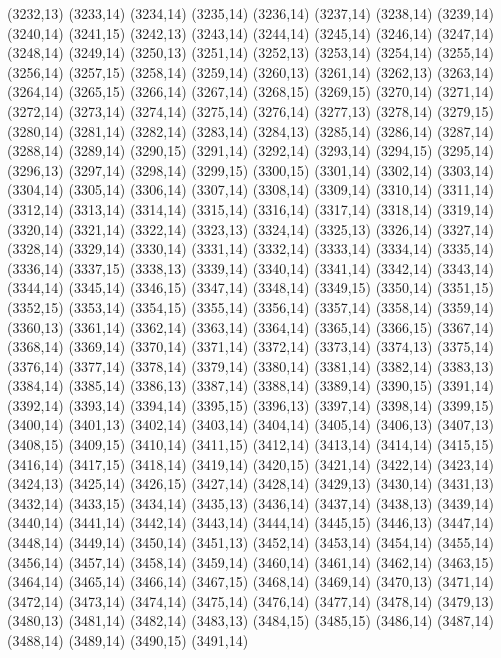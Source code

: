 (3232,13)
(3233,14)
(3234,14)
(3235,14)
(3236,14)
(3237,14)
(3238,14)
(3239,14)
(3240,14)
(3241,15)
(3242,13)
(3243,14)
(3244,14)
(3245,14)
(3246,14)
(3247,14)
(3248,14)
(3249,14)
(3250,13)
(3251,14)
(3252,13)
(3253,14)
(3254,14)
(3255,14)
(3256,14)
(3257,15)
(3258,14)
(3259,14)
(3260,13)
(3261,14)
(3262,13)
(3263,14)
(3264,14)
(3265,15)
(3266,14)
(3267,14)
(3268,15)
(3269,15)
(3270,14)
(3271,14)
(3272,14)
(3273,14)
(3274,14)
(3275,14)
(3276,14)
(3277,13)
(3278,14)
(3279,15)
(3280,14)
(3281,14)
(3282,14)
(3283,14)
(3284,13)
(3285,14)
(3286,14)
(3287,14)
(3288,14)
(3289,14)
(3290,15)
(3291,14)
(3292,14)
(3293,14)
(3294,15)
(3295,14)
(3296,13)
(3297,14)
(3298,14)
(3299,15)
(3300,15)
(3301,14)
(3302,14)
(3303,14)
(3304,14)
(3305,14)
(3306,14)
(3307,14)
(3308,14)
(3309,14)
(3310,14)
(3311,14)
(3312,14)
(3313,14)
(3314,14)
(3315,14)
(3316,14)
(3317,14)
(3318,14)
(3319,14)
(3320,14)
(3321,14)
(3322,14)
(3323,13)
(3324,14)
(3325,13)
(3326,14)
(3327,14)
(3328,14)
(3329,14)
(3330,14)
(3331,14)
(3332,14)
(3333,14)
(3334,14)
(3335,14)
(3336,14)
(3337,15)
(3338,13)
(3339,14)
(3340,14)
(3341,14)
(3342,14)
(3343,14)
(3344,14)
(3345,14)
(3346,15)
(3347,14)
(3348,14)
(3349,15)
(3350,14)
(3351,15)
(3352,15)
(3353,14)
(3354,15)
(3355,14)
(3356,14)
(3357,14)
(3358,14)
(3359,14)
(3360,13)
(3361,14)
(3362,14)
(3363,14)
(3364,14)
(3365,14)
(3366,15)
(3367,14)
(3368,14)
(3369,14)
(3370,14)
(3371,14)
(3372,14)
(3373,14)
(3374,13)
(3375,14)
(3376,14)
(3377,14)
(3378,14)
(3379,14)
(3380,14)
(3381,14)
(3382,14)
(3383,13)
(3384,14)
(3385,14)
(3386,13)
(3387,14)
(3388,14)
(3389,14)
(3390,15)
(3391,14)
(3392,14)
(3393,14)
(3394,14)
(3395,15)
(3396,13)
(3397,14)
(3398,14)
(3399,15)
(3400,14)
(3401,13)
(3402,14)
(3403,14)
(3404,14)
(3405,14)
(3406,13)
(3407,13)
(3408,15)
(3409,15)
(3410,14)
(3411,15)
(3412,14)
(3413,14)
(3414,14)
(3415,15)
(3416,14)
(3417,15)
(3418,14)
(3419,14)
(3420,15)
(3421,14)
(3422,14)
(3423,14)
(3424,13)
(3425,14)
(3426,15)
(3427,14)
(3428,14)
(3429,13)
(3430,14)
(3431,13)
(3432,14)
(3433,15)
(3434,14)
(3435,13)
(3436,14)
(3437,14)
(3438,13)
(3439,14)
(3440,14)
(3441,14)
(3442,14)
(3443,14)
(3444,14)
(3445,15)
(3446,13)
(3447,14)
(3448,14)
(3449,14)
(3450,14)
(3451,13)
(3452,14)
(3453,14)
(3454,14)
(3455,14)
(3456,14)
(3457,14)
(3458,14)
(3459,14)
(3460,14)
(3461,14)
(3462,14)
(3463,15)
(3464,14)
(3465,14)
(3466,14)
(3467,15)
(3468,14)
(3469,14)
(3470,13)
(3471,14)
(3472,14)
(3473,14)
(3474,14)
(3475,14)
(3476,14)
(3477,14)
(3478,14)
(3479,13)
(3480,13)
(3481,14)
(3482,14)
(3483,13)
(3484,15)
(3485,15)
(3486,14)
(3487,14)
(3488,14)
(3489,14)
(3490,15)
(3491,14)
